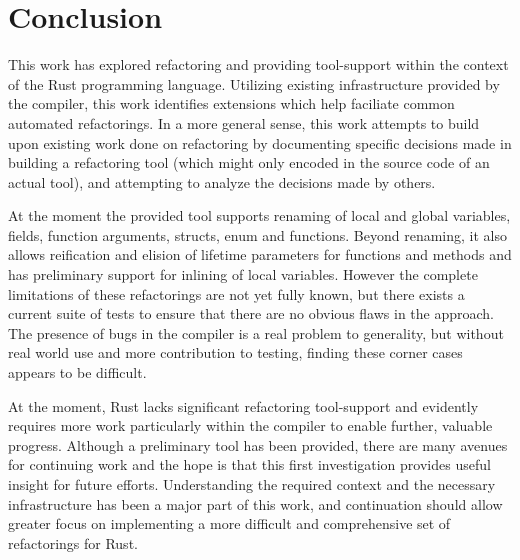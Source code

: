 \chapter{Conclusion}\label{C:con}
This work has explored refactoring and providing tool-support within the context of the Rust programming language. Utilizing existing infrastructure provided by the compiler, this work identifies extensions which help faciliate common automated refactorings. In a more general sense, this work attempts to build upon existing work done on refactoring by documenting specific decisions made in building a refactoring tool (which might only encoded in the source code of an actual tool), and attempting to analyze the decisions made by others.


At the moment the provided tool supports renaming of local and global variables, fields, function arguments, structs, enum and functions. Beyond renaming, it also allows reification and elision of lifetime parameters for functions and methods and has preliminary support for inlining of local variables. However the complete limitations of these refactorings are not yet fully known, but there exists a current suite of tests to ensure that there are no obvious flaws in the approach. The presence of bugs in the compiler is a real problem to generality, but without real world use and more contribution to testing, finding these corner cases appears to be difficult.

At the moment, Rust lacks significant refactoring tool-support and evidently requires more work particularly within the compiler to enable further, valuable progress. Although a preliminary tool has been provided, there are many avenues for continuing work and the hope is that this first investigation provides useful insight for future efforts. Understanding the required context and the necessary infrastructure has been a major part of this work, and continuation should allow greater focus on implementing a more difficult and comprehensive set of refactorings for Rust.